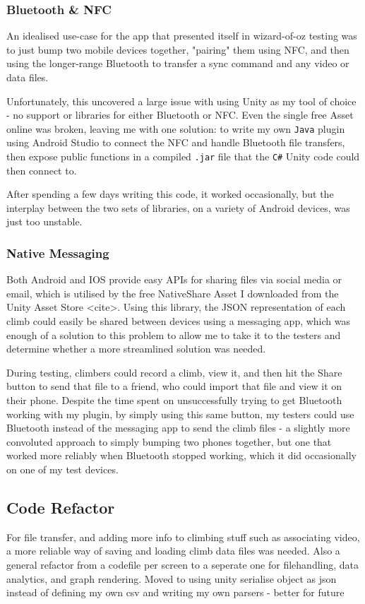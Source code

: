 \subsubsection{Bluetooth & NFC}
An idealised use-case for the app that presented itself in wizard-of-oz testing was to just bump two mobile devices together, "pairing" them using NFC, and then using the longer-range Bluetooth to transfer a sync command and any video or data files.

Unfortunately, this uncovered a large issue with using Unity as my tool of choice - no support or libraries for either Bluetooth or NFC. 
Even the single free Asset online was broken, leaving me with one solution: to write my own \verb|Java| plugin using Android Studio to connect the NFC and handle Bluetooth file transfers, then expose public functions in a compiled \verb|.jar| file that the \verb|C#| Unity code could then connect to.

After spending a few days writing this code, it worked occasionally, but the interplay between the two sets of libraries, on a variety of Android devices, was just too unstable.

\subsubsection{Native Messaging}
Both Android and IOS provide easy APIs for sharing files via social media or email, which is utilised by the free NativeShare Asset I downloaded from the Unity Asset Store <cite>.
Using this library, the JSON representation of each climb could easily be shared between devices using a messaging app, which was enough of a solution to this problem to allow me to take it to the testers and determine whether a more streamlined solution was needed.

During testing, climbers could record a climb, view it, and then hit the Share button to send that file to a friend, who could import that file and view it on their phone.
Despite the time spent on unsuccessfully trying to get Bluetooth working with my plugin, by simply using this same button, my testers could use Bluetooth instead of the messaging app to send the climb files - a slightly more convoluted approach to simply bumping two phones together, but one that worked more reliably when Bluetooth stopped working, which it did occasionally on one of my test devices.



\subsection{Code Refactor}
For file transfer, and adding more info to climbing stuff such as associating video, a more reliable way of saving and loading climb data files was needed.
Also a general refactor from a codefile per screen to a seperate one for filehandling, data analytics, and graph rendering.
Moved to using unity serialise object as json instead of defining my own csv and writing my own parsers - better for future



